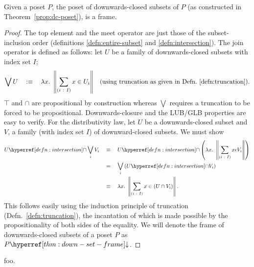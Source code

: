 \begin{thm}\label{thm:down-set-frame}
  Given a poset $P$, the poset of downwards-closed subsets of $P$ (as constructed in
  Theorem~\ref{prop:dc-poset}), is a frame.
\end{thm}
\begin{proof}
  The top element and the meet operator are just those of the subset-inclusion order
  (definitions \ref{defn:entire-subset} and \ref{defn:intersection}). The join operator is
  defined as follows: let $U$ be a family of downwards-closed subsets with index set $I$;
  \begin{align*}
    \bigvee U \quad:\equiv\quad \lambda x.~ \left\| \sum_{(i~:~I)} x \in U_i \right\|
      && \text{(using truncation as given in Defn.~\ref{defn:truncation})}.
  \end{align*}
  $\top$ and $\cap$ are propositional by construction whereas $\bigvee$ requires a truncation to be
  forced to be propositional. Downwards-closure and the LUB/GLB properties are easy to
  verify. For the distributivity law, let $U$ be a downwards-closed subset and $V$, a
  family (with index set $I$) of downward-closed subsets. We must show
  \begin{align*}
    \intersect{U}{\bigvee_i V_i}
      \quad&\equiv\quad \intersect{U}{\left(\lambda x.~ \trunc{\sigmaty{i}{I}{x \epsilon V_i}}\right)}\\
      \quad&=\quad \bigvee_i \left(\intersect{U}{V_i} \right)\\
      \quad&\equiv\quad \lambda x.~ \trunc{\sigmaty{i}{I}{x \in (U \cap V_i)}}.
  \end{align*}
  This follows easily using the induction principle of truncation
  (Defn.~\ref{defn:truncation}), the incantation of which is made possible by the
  propositionality of both sides of the equality. We will denote the frame of
  downwards-closed subsets of a poset $P$ as $\dcframe{P}$.
\end{proof}


\begin{defn}\label{defn:down-clos}
  foo.

\end{defn}

